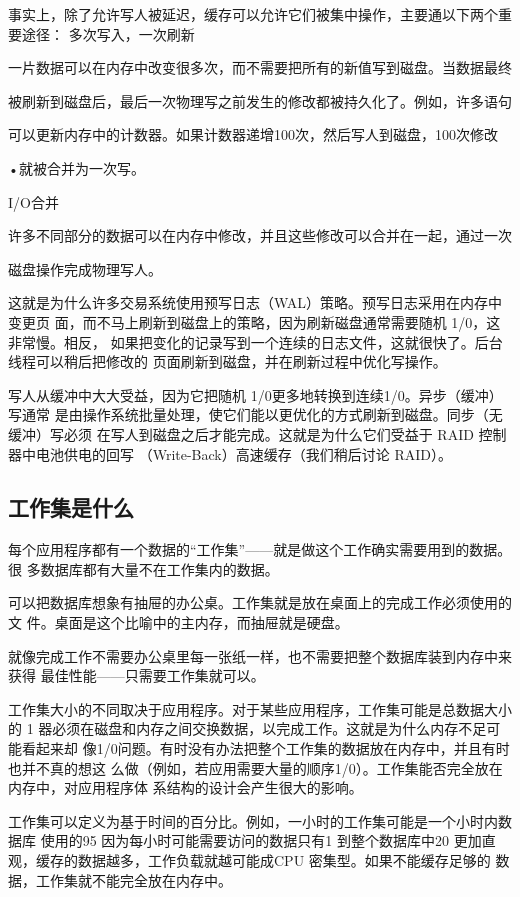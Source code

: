 事实上，除了允许写人被延迟，缓存可以允许它们被集中操作，主要通以下两个重要途径：
多次写入，一次刷新

一片数据可以在内存中改变很多次，而不需要把所有的新值写到磁盘。当数据最终

被刷新到磁盘后，最后一次物理写之前发生的修改都被持久化了。例如，许多语句

可以更新内存中的计数器。如果计数器递增100次，然后写人到磁盘，100次修改

•就被合并为一次写。

I/O合并

许多不同部分的数据可以在内存中修改，并且这些修改可以合并在一起，通过一次

磁盘操作完成物理写人。

这就是为什么许多交易系统使用预写日志（WAL）策略。预写日志采用在内存中变更页
面，而不马上刷新到磁盘上的策略，因为刷新磁盘通常需要随机 1/0，这非常慢。相反，
如果把变化的记录写到一个连续的日志文件，这就很快了。后台线程可以稍后把修改的
页面刷新到磁盘，并在刷新过程中优化写操作。

写人从缓冲中大大受益，因为它把随机 1/0更多地转换到连续1/0。异步（缓冲）写通常
是由操作系统批量处理，使它们能以更优化的方式刷新到磁盘。同步（无缓冲）写必须
在写人到磁盘之后才能完成。这就是为什么它们受益于 RAID 控制器中电池供电的回写
（Write-Back）高速缓存（我们稍后讨论 RAID）。

\subsection{工作集是什么}
每个应用程序都有一个数据的“工作集”——就是做这个工作确实需要用到的数据。很
多数据库都有大量不在工作集内的数据。

可以把数据库想象有抽屉的办公桌。工作集就是放在桌面上的完成工作必须使用的文
件。桌面是这个比喻中的主内存，而抽屉就是硬盘。

就像完成工作不需要办公桌里每一张纸一样，也不需要把整个数据库装到内存中来获得
最佳性能——只需要工作集就可以。

工作集大小的不同取决于应用程序。对于某些应用程序，工作集可能是总数据大小的
1%
器必须在磁盘和内存之间交换数据，以完成工作。这就是为什么内存不足可能看起来却
像1/0问题。有时没有办法把整个工作集的数据放在内存中，并且有时也并不真的想这
么做（例如，若应用需要大量的顺序1/0）。工作集能否完全放在内存中，对应用程序体
系结构的设计会产生很大的影响。

工作集可以定义为基于时间的百分比。例如，一小时的工作集可能是一个小时内数据库
使用的95%
因为每小时可能需要访问的数据只有1%
到整个数据库中20%
更加直观，缓存的数据越多，工作负载就越可能成CPU 密集型。如果不能缓存足够的
数据，工作集就不能完全放在内存中。

